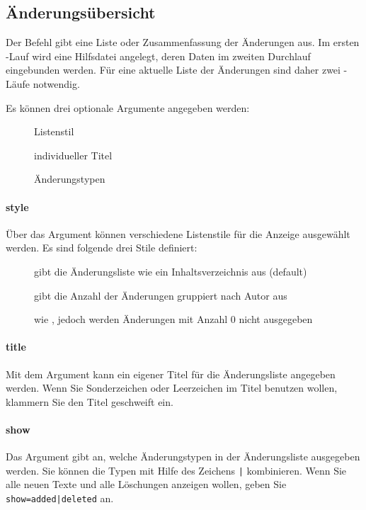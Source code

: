 \subsection{Änderungsübersicht}
\label{sec:ui:overview}




Der Befehl  gibt eine Liste oder Zusammenfassung der Änderungen aus.
Im ersten -Lauf wird eine Hilfsdatei angelegt, deren Daten im zweiten Durchlauf eingebunden werden.
Für eine aktuelle Liste der Änderungen sind daher zwei -Läufe notwendig.

Es können drei optionale Argumente angegeben werden:

\begin{description}
	\item[] Listenstil
	\item[] individueller Titel
	\item[] Änderungstypen
\end{description}

\paragraph{style}
Über das Argument  können verschiedene Listenstile für die Anzeige ausgewählt werden.
Es sind folgende drei Stile definiert:

\begin{description}
	\item[] gibt die Änderungsliste wie ein Inhaltsverzeichnis aus (default)
	\item[] gibt die Anzahl der Änderungen gruppiert nach Autor aus
	\item[] wie , jedoch werden Änderungen mit Anzahl 0 nicht ausgegeben
\end{description}

\paragraph{title}
Mit dem Argument  kann ein eigener Titel für die Änderungsliste angegeben werden.
Wenn Sie Sonderzeichen oder Leerzeichen im Titel benutzen wollen, klammern Sie den Titel geschweift ein.

\paragraph{show}
Das Argument  gibt an, welche Änderungstypen in der Änderungsliste ausgegeben werden.
Sie können die Typen mit Hilfe des Zeichens \texttt{|} kombinieren.
Wenn Sie \zB alle neuen Texte und alle Löschungen anzeigen wollen, geben Sie \texttt{show=added|deleted} an.

